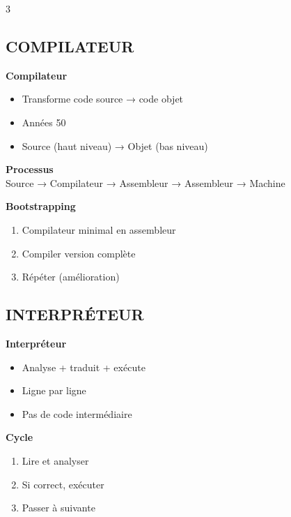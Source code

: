 \documentclass[10pt,a4paper,landscape]{article}
\begin{document}
\begin{multicols}{3}
\subsection*{COMPILATEUR}

\begin{importbox}
\textbf{Compilateur}
\begin{itemize}
\item Transforme code source → code objet
\item Années 50
\item Source (haut niveau) → Objet (bas niveau)
\end{itemize}
\end{importbox}

\begin{algobox}
\textbf{Processus}\\
Source → Compilateur → Assembleur → Assembleur → Machine
\end{algobox}

\begin{defbox}
\textbf{Bootstrapping}
\begin{enumerate}
\item Compilateur minimal en assembleur
\item Compiler version complète
\item Répéter (amélioration)
\end{enumerate}
\end{defbox}

\subsection*{INTERPRÉTEUR}

\begin{defbox}
\textbf{Interpréteur}
\begin{itemize}
\item Analyse + traduit + exécute
\item Ligne par ligne
\item Pas de code intermédiaire
\end{itemize}
\end{defbox}

\begin{importbox}
\textbf{Cycle}
\begin{enumerate}
\item Lire et analyser
\item Si correct, exécuter
\item Passer à suivante
\end{enumerate}
\end{importbox}


\end{multicols}
\end{document}
